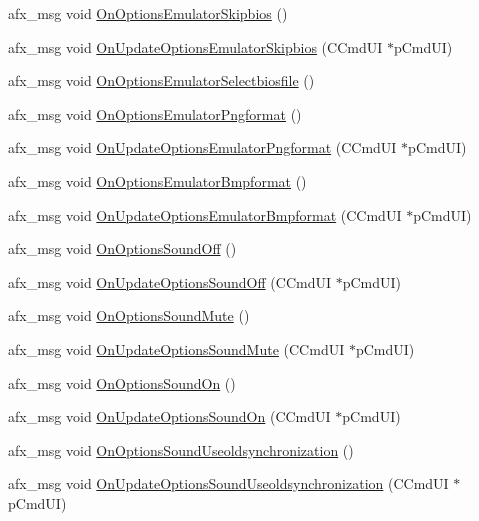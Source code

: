 \begin{DoxyCompactItemize}
\item 
afx\+\_\+msg void \mbox{\hyperlink{class_main_wnd_a41f8561c0b900be55957b1b6be4b6930}{On\+Options\+Emulator\+Skipbios}} ()
\item 
afx\+\_\+msg void \mbox{\hyperlink{class_main_wnd_a6808315740b4fa5adcd51384dff66b2a}{On\+Update\+Options\+Emulator\+Skipbios}} (C\+Cmd\+UI $\ast$p\+Cmd\+UI)
\item 
afx\+\_\+msg void \mbox{\hyperlink{class_main_wnd_a7a3ee694ccb8d2fd21066b71d93cef22}{On\+Options\+Emulator\+Selectbiosfile}} ()
\item 
afx\+\_\+msg void \mbox{\hyperlink{class_main_wnd_a7b6bec3286f6833167cd6e6adfcf39e0}{On\+Options\+Emulator\+Pngformat}} ()
\item 
afx\+\_\+msg void \mbox{\hyperlink{class_main_wnd_aaf6f0e9673e24e2137d2bdf8527a2a1a}{On\+Update\+Options\+Emulator\+Pngformat}} (C\+Cmd\+UI $\ast$p\+Cmd\+UI)
\item 
afx\+\_\+msg void \mbox{\hyperlink{class_main_wnd_abbfe0cda67be481a746de75493b6af07}{On\+Options\+Emulator\+Bmpformat}} ()
\item 
afx\+\_\+msg void \mbox{\hyperlink{class_main_wnd_a2db751ffefb04f3b4d337e29f6d1da7d}{On\+Update\+Options\+Emulator\+Bmpformat}} (C\+Cmd\+UI $\ast$p\+Cmd\+UI)
\item 
afx\+\_\+msg void \mbox{\hyperlink{class_main_wnd_a4d0172fc524e4d24d039ac5050acf160}{On\+Options\+Sound\+Off}} ()
\item 
afx\+\_\+msg void \mbox{\hyperlink{class_main_wnd_a5c80e54eef1bc1e6cd6d00f2c196c2c0}{On\+Update\+Options\+Sound\+Off}} (C\+Cmd\+UI $\ast$p\+Cmd\+UI)
\item 
afx\+\_\+msg void \mbox{\hyperlink{class_main_wnd_affac8ac6a130bb9f388c6d4148ae1a0d}{On\+Options\+Sound\+Mute}} ()
\item 
afx\+\_\+msg void \mbox{\hyperlink{class_main_wnd_a63964846dcc81703c9041f4b4c6d92c2}{On\+Update\+Options\+Sound\+Mute}} (C\+Cmd\+UI $\ast$p\+Cmd\+UI)
\item 
afx\+\_\+msg void \mbox{\hyperlink{class_main_wnd_a98e970e0bfd8e8bdfd58b5bf6068d75f}{On\+Options\+Sound\+On}} ()
\item 
afx\+\_\+msg void \mbox{\hyperlink{class_main_wnd_a116f77e43b912bb2fcf33d746294882f}{On\+Update\+Options\+Sound\+On}} (C\+Cmd\+UI $\ast$p\+Cmd\+UI)
\item 
afx\+\_\+msg void \mbox{\hyperlink{class_main_wnd_a58f33cfb8f434804b45d391e7a9a9427}{On\+Options\+Sound\+Useoldsynchronization}} ()
\item 
afx\+\_\+msg void \mbox{\hyperlink{class_main_wnd_ad409c739ea2f37ff73e079067d75d2e5}{On\+Update\+Options\+Sound\+Useoldsynchronization}} (C\+Cmd\+UI $\ast$p\+Cmd\+UI)

\end{DoxyCompactItemize}
